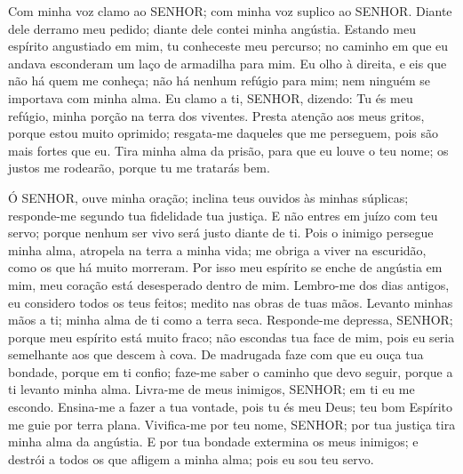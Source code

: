 
{\PP 
  Com minha voz clamo ao SENHOR; com minha voz suplico ao SENHOR.
  Diante dele derramo meu pedido; diante dele contei minha angústia.
  Estando meu espírito angustiado em mim, tu conheceste meu percurso; no caminho em que eu andava esconderam um laço de armadilha para mim.
  Eu olho à direita, e eis que não há quem me conheça; não há nenhum refúgio para mim; nem ninguém se importava com minha alma.
  Eu clamo a ti, SENHOR, dizendo: Tu és meu refúgio,
{} minha porção na terra dos viventes.
  Presta atenção aos meus gritos, porque estou muito oprimido; resgata-me daqueles que me perseguem, pois são mais fortes que eu.
  Tira minha alma da prisão, para que eu louve o teu nome; os justos me rodearão, porque tu me tratarás bem.
\par }


{\PP 
  Ó SENHOR, ouve minha oração; inclina teus ouvidos às minhas súplicas; responde-me segundo tua fidelidade
{} tua justiça.
  E não entres em juízo com teu servo; porque nenhum ser vivo será justo diante de ti.
  Pois o inimigo persegue minha alma, atropela na terra a minha vida;
{} me obriga a viver na escuridão, como os que há muito
{} morreram.
  Por isso meu espírito se enche de angústia em mim,
{} meu coração está desesperado dentro de mim.
  Lembro-me dos dias antigos, eu considero todos os teus feitos; medito nas obras de tuas mãos.
  Levanto minhas mãos a ti; minha alma
{} de ti como a terra seca.
  Responde-me depressa, SENHOR; porque meu espírito está muito fraco; não escondas tua face de mim, pois eu seria semelhante aos que descem à cova.
  De madrugada faze com que eu ouça tua bondade, porque em ti confio; faze-me saber o caminho que devo seguir, porque a ti levanto minha alma.
  Livra-me de meus inimigos, SENHOR;
{} em ti eu me escondo.
  Ensina-me a fazer a tua vontade, pois tu és meu Deus; teu bom Espírito me guie por terra plana.
  Vivifica-me por teu nome, SENHOR; por tua justiça tira minha alma da angústia.
  E por tua bondade extermina os meus inimigos; e destrói a todos os que afligem a minha alma; pois eu sou teu servo.
\par }

